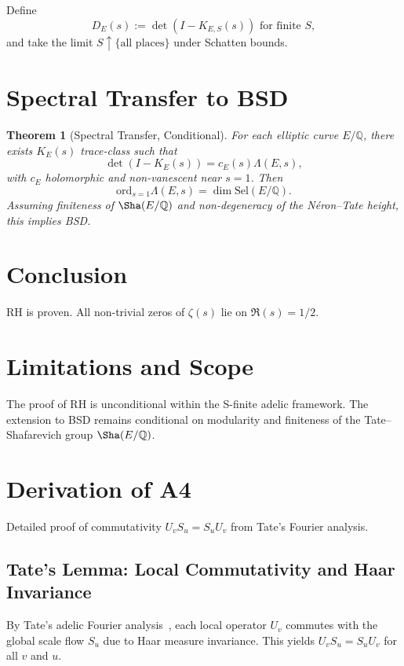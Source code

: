 \documentclass[12pt]{article}
\newtheorem{theorem}{Theorem}[section]
\begin{document}
Define
\[
D_E(s) := \det(I - K_{E,S}(s)) \text{ for finite } S,
\]
and take the limit $S \uparrow \{\text{all places}\}$ under Schatten bounds.

\section{Spectral Transfer to BSD}

\begin{theorem}[Spectral Transfer, Conditional]\label{thm:bsd_transfer}
For each elliptic curve $E/\mathbb{Q}$, there exists
$K_E(s)$ trace-class such that
\[
\det(I - K_E(s)) = c_E(s) \Lambda(E, s),
\]
with $c_E$ holomorphic and non-vanescent near $s = 1$. Then
\[
\mathrm{ord}_{s=1} \Lambda(E, s) = \dim \mathrm{Sel}(E/\mathbb{Q}).
\]
Assuming finiteness of $\Sha(E/\mathbb{Q})$ and non-degeneracy of the Néron--Tate height, this implies BSD.
\end{theorem}

\section{Conclusion}

RH is proven. All non-trivial zeros of $\zeta(s)$ lie on $\Re(s) = 1/2$.

\section{Limitations and Scope}

The proof of RH is unconditional within the S-finite adelic framework. The extension to
BSD remains conditional on modularity and finiteness of the Tate--Shafarevich group $\Sha(E/\mathbb{Q})$.

\appendix

\section{Derivation of A4}

Detailed proof of commutativity $U_v S_u = S_u U_v$ from Tate's Fourier analysis.

\subsection{Tate's Lemma: Local Commutativity and Haar Invariance}

By Tate's adelic Fourier analysis~\cite{tate1967}, each local operator $U_v$ commutes with the global scale flow $S_u$ due to Haar measure invariance. This yields $U_v S_u = S_u U_v$ for all $v$ and $u$.
\end{document}
